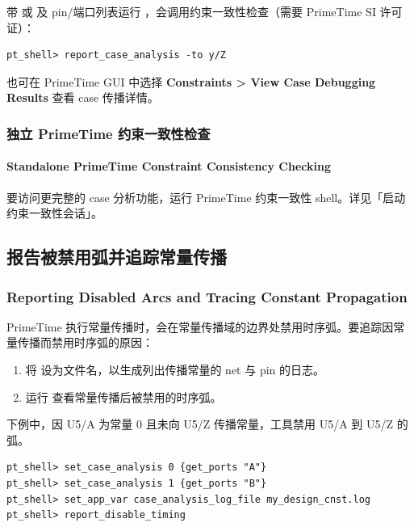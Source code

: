 带  或  及 pin/端口列表运行 ，会调用约束一致性检查（需要 PrimeTime SI 许可证）：
\begin{lstlisting}
pt_shell> report_case_analysis -to y/Z
\end{lstlisting}

也可在 PrimeTime GUI 中选择 \textbf{Constraints > View Case Debugging Results} 查看 case 传播详情。

\subsubsection{独立 PrimeTime 约束一致性检查}
\paragraph*{Standalone PrimeTime Constraint Consistency Checking}

要访问更完整的 case 分析功能，运行 PrimeTime 约束一致性 shell。详见「启动约束一致性会话」。

\subsection{报告被禁用弧并追踪常量传播}
\subsubsection*{Reporting Disabled Arcs and Tracing Constant Propagation}

PrimeTime 执行常量传播时，会在常量传播域的边界处禁用时序弧。要追踪因常量传播而禁用时序弧的原因：
\begin{enumerate}
  \item 将  设为文件名，以生成列出传播常量的 net 与 pin 的日志。
  \item 运行  查看常量传播后被禁用的时序弧。
\end{enumerate}

下例中，因 U5/A 为常量 0 且未向 U5/Z 传播常量，工具禁用 U5/A 到 U5/Z 的弧。


\begin{lstlisting}
pt_shell> set_case_analysis 0 {get_ports "A"}
pt_shell> set_case_analysis 1 {get_ports "B"}
pt_shell> set_app_var case_analysis_log_file my_design_cnst.log
pt_shell> report_disable_timing
\end{lstlisting}

